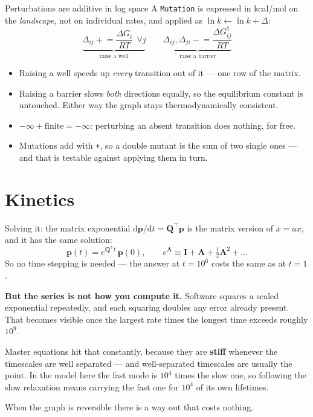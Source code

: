 \documentclass[10pt,aspectratio=169]{beamer}
\newcommand{\Q}{\bm{Q}}
\newcommand{\code}[1]{\texttt{\small #1}}
\begin{document}
\begin{frame}{Perturbations are additive in log space}
  A \code{Mutation} is expressed in kcal/mol on the \emph{landscape}, not on
  individual rates, and applied as $\ln k \leftarrow \ln k + \Delta$:
  \[
    \underbrace{\Delta_{ij} \mathrel{+}= \frac{\Delta G_i}{RT}
      \ \ \forall j}_{\text{raise a well}}
    \qquad
    \underbrace{\Delta_{ij},\Delta_{ji} \mathrel{-}=
      \frac{\Delta G^\ddag_{ij}}{RT}}_{\text{raise a barrier}}
  \]
  \begin{itemize}
    \item Raising a well speeds up \emph{every} transition out of it ---
      one row of the matrix.
    \item Raising a barrier slows \emph{both} directions equally, so the
      equilibrium constant is untouched. Either way the graph stays
      thermodynamically consistent.
    \item $-\infty + \text{finite} = -\infty$: perturbing an absent
      transition does nothing, for free.
    \item Mutations add with \code{+}, so a double mutant is the sum of two
      single ones --- and that is testable against applying them in turn.
  \end{itemize}
\end{frame}

\section[Kinetics]{Kinetics}

\begin{frame}{Solving it: the matrix exponential}
  $\mathrm{d}\bm{p}/\mathrm{d}t = \Q^{\!\top}\bm{p}$ is the matrix version of
  $\dot{x}=ax$, and it has the same solution:
  \[
    \bm{p}(t) = e^{\Q^{\!\top} t}\,\bm{p}(0),
    \qquad
    e^{\bm{A}} \equiv \bm{I} + \bm{A} + \tfrac{1}{2}\bm{A}^2 + \dots
  \]
  So no time stepping is needed --- the answer at $t=10^{6}$ costs the same
  as at $t=1$.

  \textbf{But the series is not how you compute it.} Software squares a
  scaled exponential repeatedly, and each squaring doubles any error
  already present. That becomes visible once the largest rate times the
  longest time exceeds roughly $10^{9}$.

  \smallskip
  Master equations hit that constantly, because they are \textbf{stiff}
  whenever the timescales are well separated --- and well-separated
  timescales are usually the point. In the model here the fast mode is
  $10^{4}$ times the slow one, so following the slow relaxation means
  carrying the fast one for $10^{4}$ of its own lifetimes.

  \smallskip
  When the graph is reversible there is a way out that costs nothing.
\end{frame}
\end{document}
